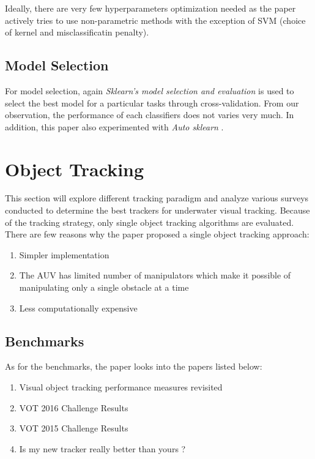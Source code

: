 \documentclass[hyp]{socreport}
\begin{document}
Ideally, there are very few hyperparameters optimization needed as the paper
actively tries to use non-parametric methods with the exception of SVM (choice
of kernel and misclassificatin penalty).

\section{Model Selection}

For model selection, again \textit{Sklearn's model selection and evaluation} is
used to select the best model for a particular tasks through cross-validation.
From our observation, the performance of each classifiers does not varies very
much. In addition, this paper also experimented with \textit{Auto sklearn}
. 


\chapter{Object Tracking}

This section will explore different tracking paradigm
 and analyze various surveys conducted to determine the best trackers
for underwater visual tracking. Because of the tracking strategy, only single
object tracking algorithms are evaluated. There are few reasons why the paper
proposed a single object tracking approach:

\begin{enumerate}
  \item Simpler implementation
  \item The AUV has limited number of manipulators which make it possible of
    manipulating only a single obstacle at a time
  \item Less computationally expensive
\end{enumerate}

\section{Benchmarks}

As for the benchmarks, the paper looks into the papers listed below:

\begin{enumerate}
  \item Visual object tracking performance measures revisited 
  \item VOT 2016 Challenge Results 
  \item VOT 2015 Challenge Results 
  \item Is my new tracker really better than yours ? 
\end{enumerate}
\end{document}
